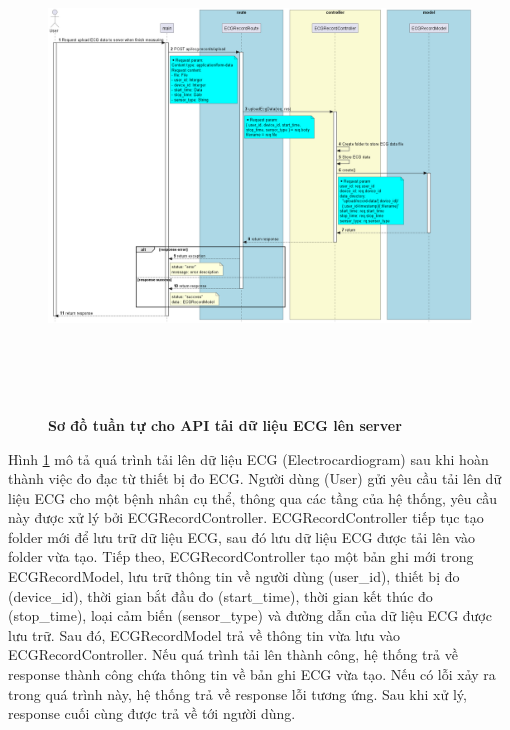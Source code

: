 \begin{figure}[H]
  \centering
  \includegraphics[width=16cm,height=13cm]{Images/server/sequence/server/uploadEcgData.png}
  \caption[Sơ đồ tuần tự cho API tải dữ liệu ECG lên server ]{\bfseries \fontsize{12pt}{0pt}
  \selectfont Sơ đồ tuần tự cho API tải dữ liệu ECG lên server }
  \label{uploadEcgData} %
\end{figure}
Hình \ref{uploadEcgData} mô tả quá trình tải lên dữ liệu ECG (Electrocardiogram) sau khi hoàn thành việc đo đạc từ thiết bị đo ECG. Người dùng (User) gửi yêu cầu tải lên dữ liệu ECG cho một bệnh nhân cụ thể, thông qua các tầng của hệ thống, yêu cầu này được xử lý bởi ECGRecordController. ECGRecordController tiếp tục tạo folder mới để lưu trữ dữ liệu ECG, sau đó lưu dữ liệu ECG được tải lên vào folder vừa tạo. Tiếp theo, ECGRecordController tạo một bản ghi mới trong ECGRecordModel, lưu trữ thông tin về người dùng (user\_id), thiết bị đo (device\_id), thời gian bắt đầu đo (start\_time), thời gian kết thúc đo (stop\_time), loại cảm biến (sensor\_type) và đường dẫn của dữ liệu ECG được lưu trữ. Sau đó, ECGRecordModel trả về thông tin vừa lưu vào ECGRecordController. Nếu quá trình tải lên thành công, hệ thống trả về response thành công chứa thông tin về bản ghi ECG vừa tạo. Nếu có lỗi xảy ra trong quá trình này, hệ thống trả về response lỗi tương ứng. Sau khi xử lý, response cuối cùng được trả về tới người dùng.



